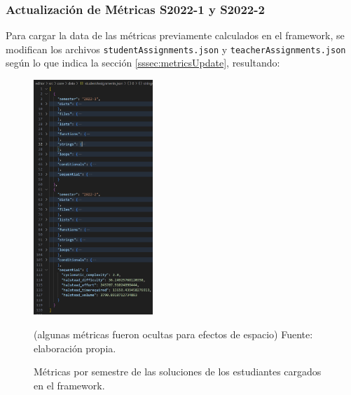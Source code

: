 \documentclass[letterpaper,12pt]{article}
\begin{document}
\subsubsection{Actualización de Métricas S2022-1 y S2022-2}

Para cargar la data de las métricas previamente calculados en el framework, se modifican los archivos \texttt{studentAssignments.json} y \texttt{teacherAssignments.json} según lo que indica la sección \ref{sssec:metricsUpdate}, resultando:

\begin{figure}[H]
  \centering
  \includegraphics[width=0.4\textwidth]{figures/studentsMetrics1.png}
  \caption{Métricas por semestre de las soluciones de los estudiantes cargados en el framework.} (algunas métricas fueron ocultas para efectos de espacio) Fuente: elaboración propia.
  \label{img:studentsMetrics1}
\end{figure}
\end{document}
